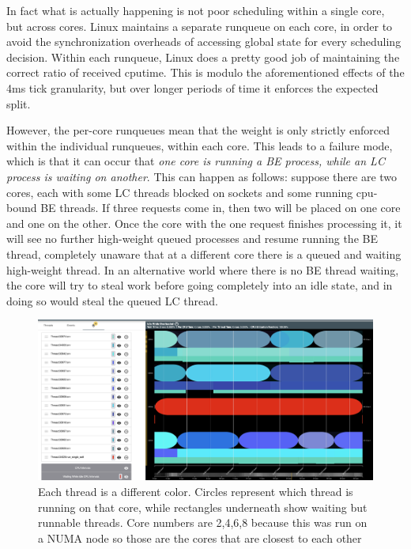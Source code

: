 In fact what is actually happening is not poor scheduling within a single core,
but across cores. Linux maintains a separate runqueue on each core, in order to
avoid the synchronization overheads of accessing global state for every
scheduling decision. Within each runqueue, Linux does a pretty good job of
maintaining the correct ratio of received cputime. This is modulo the
aforementioned effects of the 4ms tick granularity, but over longer periods of
time it enforces the expected split.

However, the per-core runqueues mean that the weight is only strictly enforced
within the individual runqueues, \ie{} within each core. This leads to a failure
mode, which is that it can occur that \textit{one core is running a BE process,
while an LC process is waiting on another}. This can happen as follows: suppose
there are two cores, each with some LC threads blocked on sockets and some
running cpu-bound BE threads. If three requests come in, then two will be placed
on one core and one on the other. Once the core with the one request finishes
processing it, it will see no further high-weight queued processes and resume
running the BE thread, completely unaware that at a different core there is a
queued and waiting high-weight thread. In an alternative world where there is no
BE thread waiting, the core will try to steal work before going completely into
an idle state, and in doing so would steal the queued LC thread.

\begin{figure}[t]
    \centering
    \includegraphics[width=\columnwidth]{graphs/schedviz.png}
    \caption{Each thread is a different color. Circles represent which
    thread is running on that core, while rectangles underneath show waiting but
    runnable threads. Core numbers are 2,4,6,8 because this was run on a NUMA
    node so those are the cores that are closest to each other
    }\label{fig:schedviz}
\end{figure}


